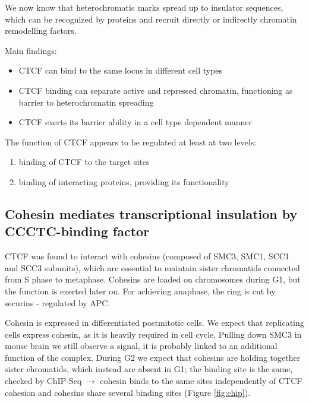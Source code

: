 We now know that heterochromatic marks spread up to insulator sequences, which can be recognized by proteins and recruit directly or indirectly chromatin remodelling factors.

Main findings:

\begin{itemize}
\tightlist
\item
  CTCF can bind to the same locus in different cell types
\item
  CTCF binding can separate active and repressed chromatin, functioning as barrier to heterochromatin spreading
\item
  CTCF exerts its barrier ability in a cell type dependent manner
\end{itemize}

The function of CTCF appears to be regulated at least at two levels:

\begin{enumerate}
\def\labelenumi{\arabic{enumi}.}
\tightlist
\item
  binding of CTCF to the target sites
\item
  binding of interacting proteins, providing its functionality
\end{enumerate}

\hypertarget{cohesin-mediates-transcriptional-insulation-by-ccctc-binding-factor}{%
\subsection{Cohesin mediates transcriptional insulation by CCCTC-binding factor}\label{cohesin-mediates-transcriptional-insulation-by-ccctc-binding-factor}}

CTCF was found to interact with cohesins (composed of SMC3, SMC1, SCC1 and SCC3 subunits), which are essential to maintain sister chromatids connected from S phase to metaphase. Cohesins are loaded on chromosomes during G1, but the function is exerted later on. For achieving anaphase, the ring is cut by securins - regulated by APC.

Cohesin is expressed in differentiated postmitotic cells. We expect that replicating cells express cohesin, as it is heavily required in cell cycle. Pulling down SMC3 in mouse brain we still observe a signal, it is probably linked to an additional function of the complex. During G2 we expect that cohesins are holding together sister chromatids, which instead are absent in G1; the binding site is the same, checked by ChIP-Seq $\rightarrow$ cohesin binds to the same sites independently of CTCF cohesion and cohesins share several binding sites (Figure \ref{fig:chip}).

